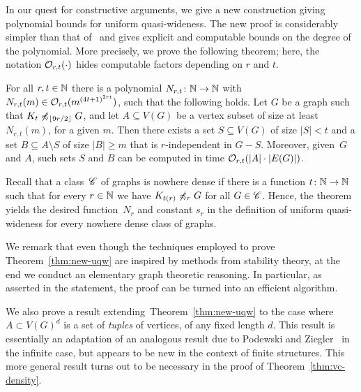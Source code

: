 \smallskip In our quest for constructive arguments, we give a new
construction giving polynomial bounds for uniform quasi-wideness.  The
new proof is considerably simpler than that
of~\cite{siebertz2016polynomial} and gives explicit and computable
bounds on the degree of the polynomial.  More precisely, we prove the
following theorem; here, the notation $\mathcal{O}_{r,t}(\cdot)$ hides
computable factors depending on $r$ and $t$.


\setcounter{uqw}{\value{theorem}}
\begin{theorem}\label{thm:new-uqw}
  For all $r,t\in \mathbb{N}$ there is a polynomial $N_{r,t}\colon \mathbb{N}\to \mathbb{N}$
  with $N_{r,t}(m)\in \mathcal{O}_{r,t}{(m^{{(4t+1)}^{2rt}})}$, such that the
  following holds.  Let $G$ be a graph such that
  $K_t\not\preccurlyeq_{\lfloor 9r/2\rfloor} G$, and let $A\subseteq V(G)$
  be a vertex subset of size at least $N_{r,t}(m)$, for a given $m$.
  Then there exists a set $S\subseteq V(G)$ of size $|S|<t$ and a set
  $B\subseteq A\setminus S$ of size $|B|\geq m$ that is
  $r$-independent in $G-S$.  Moreover, given~$G$ and $A$, such sets
  $S$ and $B$ can be computed in time $\mathcal{O}_{r,t}(|A|\cdot |E(G)|)$.
\end{theorem}

Recall that a class~$\mathscr{C}$ of graphs is nowhere dense if there is a
function $t\colon \mathbb{N}\to \mathbb{N}$ such that for every $r\in \mathbb{N}$ we have
$K_{t(r)}\not\preccurlyeq_r G$ for all $G\in \mathscr{C}$.  Hence, the theorem
yields the desired function~$N_r$ and constant $s_r$ in the definition
of uniform quasi-wideness for every nowhere dense class of graphs.

We remark that even though the techniques employed to prove
Theorem~\ref{thm:new-uqw} are inspired by methods from stability
theory, at the end we conduct an elementary graph theoretic
reasoning. In particular, as asserted in the statement, the proof can
be turned into an efficient algorithm.

We also prove a result extending~Theorem~\ref{thm:new-uqw} to the case
where $A\subset V(G)^d$ is a set of \emph{tuples} of vertices, of any
fixed length $d$.  This result is essentially an adaptation of an
analogous result due to Podewski and Ziegler~\cite{podewski1978stable}
in the infinite case, but appears to be new in the context of finite
structures.  This more general result turns out to be necessary in the
proof of Theorem~\ref{thm:vc-density}.

